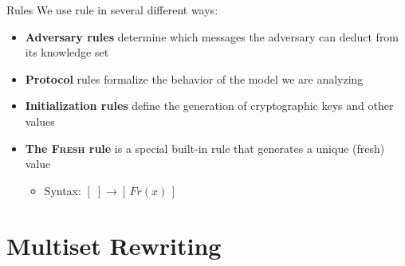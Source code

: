 \documentclass[11pt,aspectratio=169]{beamer}
\begin{document}
\begin{frame}[fragile]{Rules}
    We use rule in several different ways:
    \begin{itemize}
        \item \textbf{Adversary rules} determine which messages the adversary 
              can deduct from its knowledge set
        \item \textbf{Protocol} rules formalize the behavior of the model we 
              are analyzing
        \item \textbf{Initialization rules} define the generation of 
              cryptographic keys and other values
        \item \textbf{The \textsc{Fresh} rule} is a special built-in rule that 
              generates a unique (fresh) value
        \begin{itemize}
            \item Syntax: $[\;] \rightarrow [\,Fr(x)\,]$
        \end{itemize}
    \end{itemize}
\end{frame}


\section{Multiset Rewriting}

\end{document}
